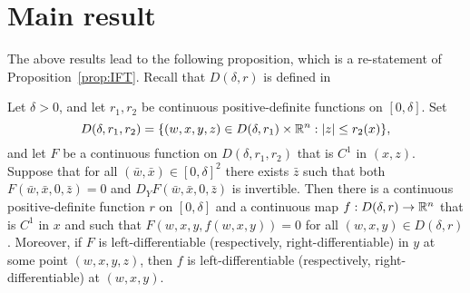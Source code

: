 \section{Main result}

The above results lead to the following proposition, which is a re-statement of
Proposition~\ref{prop:IFT}. Recall that $D(\delta, r)$ is defined in 

\begin{prop}
\label{prop:IFT-re}
Let $\delta > 0$, and let $r_1, r_2$ be continuous positive-definite functions on $[0, \delta]$.
Set
\begin{equation}
    D(\delta, r_1, r_2)
    =
    \{ (w, x, y, z) \in D(\delta, r_1) \times {\mathbb R}^n : |z| \leq r_2(x) \},
\end{equation}
and let $F$ be a continuous function on $D(\delta, r_1, r_2)$ that is $C^1$ in $(x, z)$.
Suppose that for all $(\bar w, \bar x) \in [0, \delta]^2$ there exists $\bar z$
such that both $F(\bar w, \bar x, 0, \bar z) = 0$
and $D_Y F(\bar w, \bar x, 0, \bar z)$ is invertible.
Then there is a continuous positive-definite function $r$ on $[0, \delta]$ and
a continuous map $f : D(\delta, r) \rightarrow {\mathbb R}^n$
that is $C^1$ in $x$
and such that $F(w, x, y, f(w, x, y)) = 0$
for all $(w, x, y) \in D(\delta, r)$.
Moreover, if $F$ is left-differentiable
(respectively, right-differentiable) in $y$ at some point $(w, x, y, z)$,
then $f$ is left-differentiable (respectively, right-differentiable) at $(w, x, y)$.
\end{prop}

